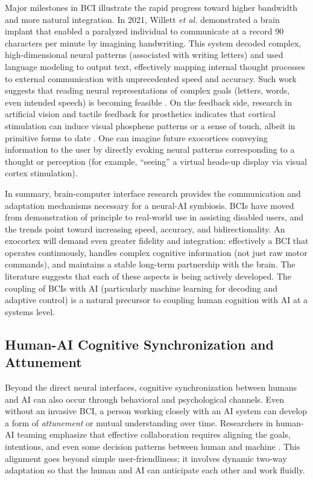 \documentclass[11pt]{article}
\newcommand{\quotes}[1]{``#1''}
\begin{document}
Major milestones in BCI illustrate the rapid progress toward higher bandwidth and more natural integration. In 2021, Willett \textit{et al.} demonstrated a brain implant that enabled a paralyzed individual to communicate at a record 90 characters per minute by imagining handwriting. This system decoded complex, high-dimensional neural patterns (associated with writing letters) and used language modeling to output text, effectively mapping internal thought processes to external communication with unprecedented speed and accuracy. Such work suggests that reading neural representations of complex goals (letters, words, even intended speech) is becoming feasible \cite{Willett2021}. On the feedback side, research in artificial vision and tactile feedback for prosthetics indicates that cortical stimulation can induce visual phosphene patterns or a sense of touch, albeit in primitive forms to date \cite{Wood}. One can imagine future exocortices conveying information to the user by directly evoking neural patterns corresponding to a thought or perception (for example, \quotes{seeing} a virtual heads-up display via visual cortex stimulation).

In summary, brain-computer interface research provides the communication and adaptation mechanisms necessary for a neural-AI symbiosis. BCIs have moved from demonstration of principle to real-world use in assisting disabled users, and the trends point toward increasing speed, accuracy, and bidirectionality. An exocortex will demand even greater fidelity and integration: effectively a BCI that operates continuously, handles complex cognitive information (not just raw motor commands), and maintains a stable long-term partnership with the brain. The literature suggests that each of these aspects is being actively developed. The coupling of BCIs with AI (particularly machine learning for decoding and adaptive control) is a natural precursor to coupling human cognition with AI at a systems level.

\subsection{Human-AI Cognitive Synchronization and Attunement}
Beyond the direct neural interfaces, cognitive synchronization between humans and AI can also occur through behavioral and psychological channels. Even without an invasive BCI, a person working closely with an AI system can develop a form of \textit{attunement} or mutual understanding over time. Researchers in human-AI teaming emphasize that effective collaboration requires aligning the goals, intentions, and even some decision patterns between human and machine \cite{Naser2023}. This alignment goes beyond simple user-friendliness; it involves dynamic two-way adaptation so that the human and AI can anticipate each other and work fluidly.
\end{document}
